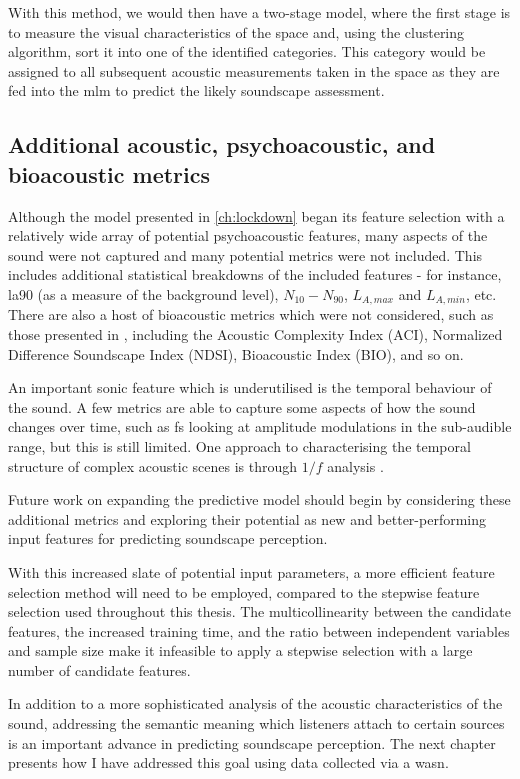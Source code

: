 With this method, we would then have a two-stage model, where the first stage is to measure the visual characteristics of the space and, using the clustering algorithm, sort it into one of the identified categories. This category would be assigned to all subsequent acoustic measurements taken in the space as they are fed into the \gls{mlm} to predict the likely soundscape assessment.

\subsection{Additional acoustic, psychoacoustic, and bioacoustic metrics}

Although the model presented in \cref{ch:lockdown} began its feature selection with a relatively wide array of potential psychoacoustic features, many aspects of the sound were not captured and many potential metrics were not included. This includes additional statistical breakdowns of the included features - for instance, \gls{la90} (as a measure of the background level), $N_{10} - N_{90}$, $L_{A,max}$ and $L_{A,min}$, etc. There are also a host of bioacoustic metrics which were not considered, such as those presented in \citet{Devos2016Soundecology}, including the Acoustic Complexity Index (ACI), Normalized Difference Soundscape Index (NDSI), Bioacoustic Index (BIO), and so on.

An important sonic feature which is underutilised is the temporal behaviour of the sound. A few metrics are able to capture some aspects of how the sound changes over time, such as \gls{fs} looking at amplitude modulations in the sub-audible range, but this is still limited. One approach to characterising the temporal structure of complex acoustic scenes is through $1/f$ analysis \citep{deCoensel20031f,deCoensel2006quiet,Yang2015Presence}.

Future work on expanding the predictive model should begin by considering these additional metrics and exploring their potential as new and better-performing input features for predicting soundscape perception.

With this increased slate of potential input parameters, a more efficient feature selection method will need to be employed, compared to the stepwise feature selection used throughout this thesis. The multicollinearity between the candidate features, the increased training time, and the ratio between independent variables and sample size make it infeasible to apply a stepwise selection with a large number of candidate features. 

In addition to a more sophisticated analysis of the acoustic characteristics of the sound, addressing the semantic meaning which listeners attach to certain sources is an important advance in predicting soundscape perception. The next chapter presents how I have addressed this goal using data collected via a \gls{wasn}.